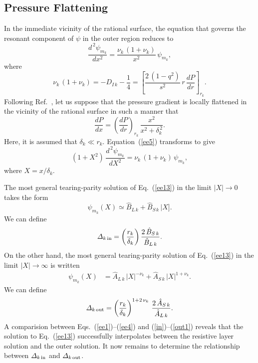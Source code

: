 \documentclass[12pt,prb,aps]{revtex4-1}
\begin{document}
\subsection{Pressure Flattening}
In the immediate vicinity of the rational surface, the equation that governs the resonant component of $\psi$ in the outer region reduces to\,\cite{tj}
\begin{equation}\label{ee5}
\frac{d^{\,2}\psi_{m_k}}{dx^2} =\frac{\nu_k\,(1+\nu_k)}{x^{2}}\,\psi_{m_k},
\end{equation}
where
\begin{equation}\label{dii}
\nu_k\,(1+\nu_k)= -D_{I\,k} -\frac{1}{4}= \left[\frac{2\,(1-q^2)}{s^2}\,r\,\frac{dP}{dr}\right]_{r_k}.
\end{equation}
Following Ref.~, let us suppose that the pressure gradient is locally flattened in the vicinity of the rational surface in such a manner that
\begin{equation}
\frac{dP}{dx} = \left(\frac{dP}{dr}\right)_{r_k}\,\frac{x^2}{x^2+\delta_k^{\,2}}.
\end{equation}
Here, it is assumed that $\delta_k\ll r_k$. Equation~(\ref{ee5}) transforms to give
\begin{equation}\label{ee13}
(1+X^2)\,\frac{d^{\,2}\psi_{m_k}}{dX^2}= \nu_k\,(1+\nu_k)\,\psi_{m_k},
\end{equation}
where $X=x/\delta_k$. 

The most general tearing-parity solution of Eq.~(\ref{ee13}) in the limit $|X|\rightarrow 0$  takes the form 
\begin{equation}\label{in}
\psi_{m_k}(X) \simeq \hat{B}_{L\,k}+ \hat{B}_{S\,k}\,|X].
\end{equation}
We can define
\begin{equation}\label{din}
{\mit\Delta}_{k\,{\rm in}} = \left(\frac{r_k}{\delta_k}\right)
\frac{2\,\hat{B}_{S\,k}}{\hat{B}_{L\,k}}.
\end{equation}
On the other hand, the most general tearing-parity solution of Eq.~(\ref{ee13}) in the limit $|X|\rightarrow \infty$  is written 
\begin{align}\label{out}
\psi_{m_k}(X)&= \hat{A}_{L\,k}\,|X|^{-\nu_k}+\hat{A}_{S\,k}\,|X|^{1+\nu_k}.
\end{align}
We can define
\begin{equation}\label{out1}
{\mit\Delta}_{k\,{\rm out}}= \left(\frac{r_k}{\delta_k}\right)^{1+2\,\nu_k}\,\frac{2\,\hat{A}_{S\,k}}{\hat{A}_{L\,k}}.
\end{equation}
A comparision between Eqs.~(\ref{ee1})--(\ref{ee4}) and (\ref{in})--(\ref{out1})  reveals that the solution to Eq.~(\ref{ee13}) successfully interpolates
between the resistive layer solution and the outer solution.  It now remains to determine the relationship between ${\mit\Delta}_{k\,{\rm in}}$ and
${\mit\Delta}_{k\,{\rm out}}$. 
\end{document}

